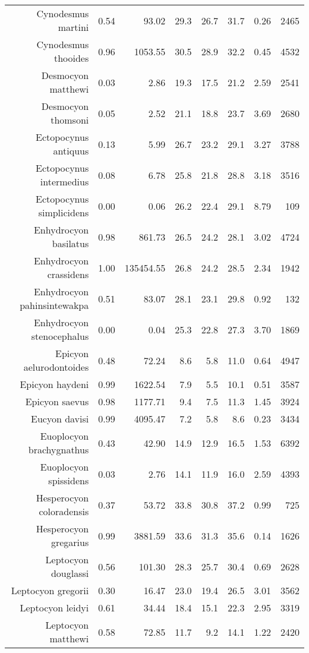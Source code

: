 \begin{table}[ht]
\begin{tabular}{rrrrrrrr}
  Cynodesmus martini & 0.54 & 93.02 & 29.3 & 26.7 & 31.7 & 0.26 & 2465 \\ 
  Cynodesmus thooides & 0.96 & 1053.55 & 30.5 & 28.9 & 32.2 & 0.45 & 4532 \\ 
  Desmocyon matthewi & 0.03 & 2.86 & 19.3 & 17.5 & 21.2 & 2.59 & 2541 \\ 
  Desmocyon thomsoni & 0.05 & 2.52 & 21.1 & 18.8 & 23.7 & 3.69 & 2680 \\ 
  Ectopocynus antiquus & 0.13 & 5.99 & 26.7 & 23.2 & 29.1 & 3.27 & 3788 \\ 
  Ectopocynus intermedius & 0.08 & 6.78 & 25.8 & 21.8 & 28.8 & 3.18 & 3516 \\ 
  Ectopocynus simplicidens & 0.00 & 0.06 & 26.2 & 22.4 & 29.1 & 8.79 & 109 \\ 
  Enhydrocyon basilatus & 0.98 & 861.73 & 26.5 & 24.2 & 28.1 & 3.02 & 4724 \\ 
  Enhydrocyon crassidens & 1.00 & 135454.55 & 26.8 & 24.2 & 28.5 & 2.34 & 1942 \\ 
  Enhydrocyon pahinsintewakpa & 0.51 & 83.07 & 28.1 & 23.1 & 29.8 & 0.92 & 132 \\ 
  Enhydrocyon stenocephalus & 0.00 & 0.04 & 25.3 & 22.8 & 27.3 & 3.70 & 1869 \\ 
  Epicyon aelurodontoides & 0.48 & 72.24 & 8.6 & 5.8 & 11.0 & 0.64 & 4947 \\ 
  Epicyon haydeni & 0.99 & 1622.54 & 7.9 & 5.5 & 10.1 & 0.51 & 3587 \\ 
  Epicyon saevus & 0.98 & 1177.71 & 9.4 & 7.5 & 11.3 & 1.45 & 3924 \\ 
  Eucyon davisi & 0.99 & 4095.47 & 7.2 & 5.8 & 8.6 & 0.23 & 3434 \\ 
  Euoplocyon brachygnathus & 0.43 & 42.90 & 14.9 & 12.9 & 16.5 & 1.53 & 6392 \\ 
  Euoplocyon spissidens & 0.03 & 2.76 & 14.1 & 11.9 & 16.0 & 2.59 & 4393 \\ 
  Hesperocyon coloradensis & 0.37 & 53.72 & 33.8 & 30.8 & 37.2 & 0.99 & 725 \\ 
  Hesperocyon gregarius & 0.99 & 3881.59 & 33.6 & 31.3 & 35.6 & 0.14 & 1626 \\ 
  Leptocyon douglassi & 0.56 & 101.30 & 28.3 & 25.7 & 30.4 & 0.69 & 2628 \\ 
  Leptocyon gregorii & 0.30 & 16.47 & 23.0 & 19.4 & 26.5 & 3.01 & 3562 \\ 
  Leptocyon leidyi & 0.61 & 34.44 & 18.4 & 15.1 & 22.3 & 2.95 & 3319 \\ 
  Leptocyon matthewi & 0.58 & 72.85 & 11.7 & 9.2 & 14.1 & 1.22 & 2420 \\ 

\end{tabular}
\end{table}

